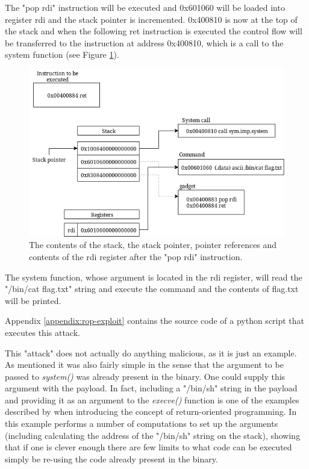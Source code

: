 The "pop rdi" instruction will be executed and 0x601060 will be loaded into register rdi
and the stack pointer is incremented. 0x400810 is now at the top of the stack and when the
following ret instruction is executed the control flow will be transferred to the
instruction at address 0x400810, which is a call to the system function (see Figure
\ref{fig:after-second}).

\begin{figure}[h]
	\centering
	\includegraphics[width=\textwidth]{background/software-diversity/figures/after-second}
	\caption{The contents of the stack, the stack pointer, pointer references and contents of the rdi register after the "pop rdi" instruction.}
	\label{fig:after-second}
\end{figure}

The system function, whose argument is located in the rdi register, will read the
"/bin/cat flag.txt" string and execute the command and the contents of flag.txt will be
printed.

Appendix \ref{appendix:rop-exploit} contains the source code of a python script that
executes this attack.

This "attack" does not actually do anything malicious, as it is just an example. As mentioned
it was also fairly simple in the sense that the argument to be passed to \textit{system()}
was already present in the binary. One could supply this argument with the payload. In
fact, including a "/bin/sh" string in the payload and providing it as an argument to the
\textit{execve()} function is one of the examples described by \textcite{rop} when
introducing the concept of return-oriented programming. In this example \textcite{rop}
performs a number of computations to set up the arguments (including calculating the address
of the "/bin/sh" string on the stack), showing that if one is clever enough there are few
limits to what code can be executed simply be re-using the code already present in the binary.


